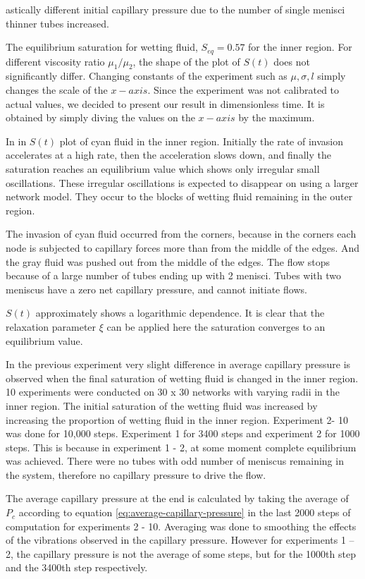 \documentclass[
	12pt
] {article}
\begin{document}
	
	astically different initial capillary pressure due to the number of single menisci thinner tubes increased.
			
	The equilibrium saturation for wetting fluid, $S_{eq} = 0.57$ for the inner region. For different viscosity ratio ${\mu}_1 / {\mu_2}$, the shape of the plot of $S(t)$ does not significantly differ. Changing constants of the experiment such as $\mu, \sigma, l$ simply changes the scale of the $x-axis$. Since the experiment was not calibrated to actual values, we decided to present our result in dimensionless time. It is obtained by simply diving the values on the $x-axis$ by the maximum.
			
	In in $S(t)$ plot of cyan fluid in the inner region. Initially the rate of invasion accelerates at a high rate, then the acceleration slows down, and finally the saturation reaches an equilibrium value which shows only irregular small oscillations. These irregular oscillations is expected to disappear on using a larger network model. They occur to the blocks of wetting fluid remaining in the outer region.
	
	The invasion of cyan fluid occurred from the corners, because in the corners each node is subjected to capillary forces more than from the middle of the edges. And the gray fluid was pushed out from the middle of the edges. The flow stops because of a large number of tubes ending up with 2 menisci. Tubes with two meniscus have a zero net capillary pressure, and cannot initiate flows. 
	
	$S(t)$ approximately shows a logarithmic dependence. It is clear that the relaxation parameter $\xi$ can be applied here the saturation converges to an equilibrium value.

	In the previous experiment very slight difference in average capillary pressure is observed when the final saturation of wetting fluid is changed in the inner region. 10 experiments were conducted on 30 x 30 networks with varying radii in the inner region. The initial saturation of the wetting fluid was increased by increasing the proportion of wetting fluid in the inner region. Experiment 2- 10 was done for 10,000 steps. Experiment 1 for 3400 steps and experiment 2 for 1000 steps. This is because in experiment 1 - 2, at some moment complete equilibrium was achieved. There were no tubes with odd number of meniscus remaining in the system, therefore no capillary pressure to drive the flow.
	
	The average capillary pressure at the end is calculated by taking the average of $P_c$ according to equation \ref{eq:average-capillary-pressure} in the last 2000 steps of computation for experiments 2 - 10. Averaging was done to smoothing the effects of the vibrations observed in the capillary pressure. However for experiments 1 – 2, the capillary pressure is not the average of some steps, but for the 1000th step and the 3400th step respectively.
	
\end{document}

